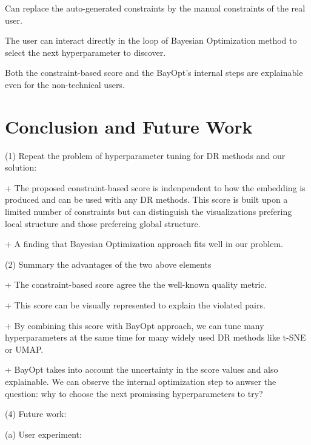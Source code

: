 \par
Can replace the auto-generated constraints by the manual constraints of the real user.

\par
The user can interact directly in the loop of Bayesian Optimization method to select the next hyperparameter to discover.


\par
Both the constraint-based score and the BayOpt's internal steps are explainable even for the non-technical users. 



\section{Conclusion and Future Work}

\par (1) Repeat the problem of hyperparameter tuning for DR methods and our solution:

+ The proposed constraint-based score is indenpendent to how the embedding is produced and can be used with any DR methods.
This score is built upon a limited number of constraints but can distinguish the visualizations prefering local structure and those prefereing global structure.

+ A finding that Bayesian Optimization approach fits well in our problem.


\vspace{8pt}
\par (2) Summary the advantages of the two above elements

+ The constraint-based score agree the the well-known quality metric.

+ This score can be visually represented to explain the violated pairs.

+ By combining this score with BayOpt approach, we can tune many hyperparameters at the same time for many widely used DR methods like t-SNE or UMAP.

+ BayOpt takes into account the uncertainty in the score values and also explainable. We can observe the internal optimization step to anwser the question: why to choose the next promissing hyperparameters to try?


\vspace{8pt}
\par (4) Future work:

(a) User experiment:

